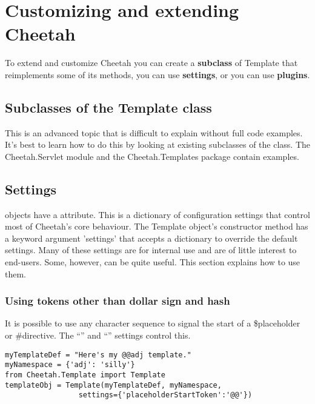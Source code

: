 \section{Customizing and extending Cheetah}
\label{customizing}

To extend and customize Cheetah you can create a {\bf subclass} of Template that
reimplements some of its methods, you can use {\bf settings}, or you can use
{\bf plugins}.

\subsection{Subclasses of the Template class}

This is an advanced topic that is difficult to explain without full code
examples.  It's best to learn how to do this by looking at existing subclasses
of the  class.  The Cheetah.Servlet module and the
Cheetah.Templates package contain examples.


\subsection{Settings}

 objects have a  attribute. This is a dictionary of
configuration settings that control most of Cheetah's core behaviour.  The
Template object's constructor method has a keyword argument 'settings' that
accepts a dictionary to override the default settings.  Many of these settings
are for internal use and are of little interest to end-users.  Some, however,
can be quite useful.  This section explains how to use them.

\subsubsection{Using tokens other than dollar sign and hash}

It is possible to use any character sequence to signal the start of a
\$placeholder or \#directive.  The ``'' and
``'' settings control this.

\begin{verbatim}
myTemplateDef = "Here's my @@adj template."
myNamespace = {'adj': 'silly'}
from Cheetah.Template import Template
templateObj = Template(myTemplateDef, myNamespace, 
                 settings={'placeholderStartToken':'@@'})
\end{verbatim}

